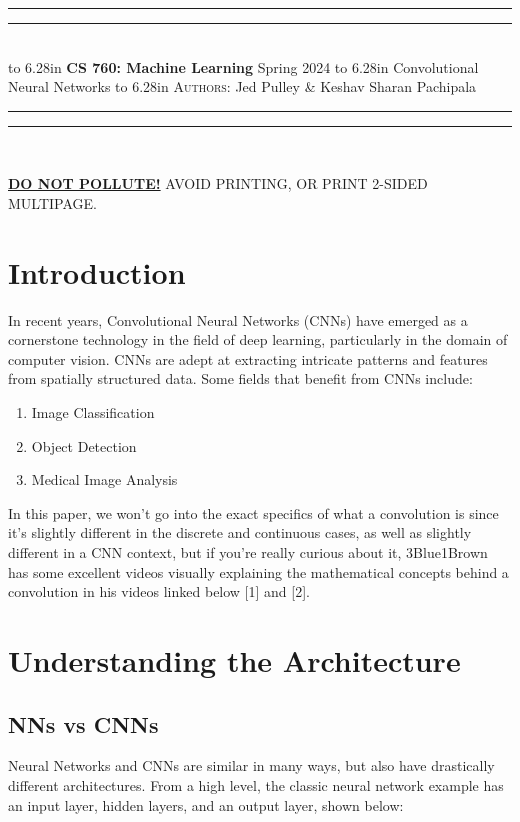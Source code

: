 \documentclass{article}
\newcommand{\lecture}[2]{
\pagestyle{myheadings}
\thispagestyle{plain}
\newpage
\noindent
\begin{center}
\rule{\textwidth}{1.6pt}\vspace*{-\baselineskip}\vspace*{2pt} %
\rule{\textwidth}{0.4pt}\\[1\baselineskip] %
\vbox{\vspace{2mm}
\hbox to 6.28in { {\bf CS 760: Machine Learning} \hfill Spring 2024 }
\vspace{4mm}
\hbox to 6.28in { {\Large \hfill #1  \hfill} }
\vspace{4mm}
\hbox to 6.28in { {\scshape Authors:}  #2 \hfill }}
\vspace{-2mm}
\rule{\textwidth}{0.4pt}\vspace*{-\baselineskip}\vspace{3.2pt} %
\rule{\textwidth}{1.6pt}\\[\baselineskip] %
\end{center}
\vspace*{4mm}
}
\begin{document}
\lecture{Convolutional Neural Networks}{Jed Pulley \& Keshav Sharan Pachipala}

\begin{center}
{\Large {\sf \underline{\textbf{DO NOT POLLUTE!}} AVOID PRINTING, OR PRINT 2-SIDED MULTIPAGE.}}
\end{center}


\section{Introduction}
    In recent years, Convolutional Neural Networks (CNNs) have emerged as a cornerstone technology in the field of deep learning, particularly in the domain of computer vision. CNNs are adept at extracting intricate patterns and features from spatially structured data. Some fields that benefit from CNNs include:
    
    \begin{enumerate}
        \item Image Classification
        \item Object Detection
        \item Medical Image Analysis
    \end{enumerate}
    
    In this paper, we won't go into the exact specifics of what a convolution is since it's slightly different in the discrete and continuous cases, as well as slightly different in a CNN context, but if you're really curious about it, 3Blue1Brown has some excellent videos visually explaining the mathematical concepts behind a convolution in his videos linked below [1] and [2].

\section{Understanding the Architecture}
    \subsection{NNs vs CNNs}
        Neural Networks and CNNs are similar in many ways, but also have drastically different architectures. From a high level, the classic neural network example has an input layer, hidden layers, and an output layer, shown below:
        
\end{document}
